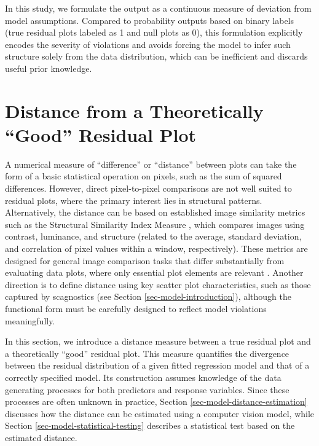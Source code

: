 \documentclass[]{interact}
\theoremstyle{plain}%
\theoremstyle{definition}
\theoremstyle{remark}
\begin{document}
In this study, we formulate the output as a continuous measure of
deviation from model assumptions. Compared to probability outputs based
on binary labels (true residual plots labeled as 1 and null plots as 0),
this formulation explicitly encodes the severity of violations and
avoids forcing the model to infer such structure solely from the data
distribution, which can be inefficient and discards useful prior
knowledge.

\section{Distance from a Theoretically ``Good'' Residual
Plot}\label{sec-model-distance-between-residual-plots}

A numerical measure of ``difference'' or ``distance'' between plots can
take the form of a basic statistical operation on pixels, such as the
sum of squared differences. However, direct pixel-to-pixel comparisons
are not well suited to residual plots, where the primary interest lies
in structural patterns. Alternatively, the distance can be based on
established image similarity metrics such as the Structural Similarity
Index Measure \citep{wang2004image}, which compares images using
contrast, luminance, and structure (related to the average, standard
deviation, and correlation of pixel values within a window,
respectively). These metrics are designed for general image comparison
tasks that differ substantially from evaluating data plots, where only
essential plot elements are relevant \citep{chowdhury2018measuring}.
Another direction is to define distance using key scatter plot
characteristics, such as those captured by scagnostics (see Section
\ref{sec-model-introduction}), although the functional form must be
carefully designed to reflect model violations meaningfully.

In this section, we introduce a distance measure between a true residual
plot and a theoretically ``good'' residual plot. This measure quantifies
the divergence between the residual distribution of a given fitted
regression model and that of a correctly specified model. Its
construction assumes knowledge of the data generating processes for both
predictors and response variables. Since these processes are often
unknown in practice, Section \ref{sec-model-distance-estimation}
discusses how the distance can be estimated using a computer vision
model, while Section \ref{sec-model-statistical-testing} describes a
statistical test based on the estimated distance.
\end{document}

